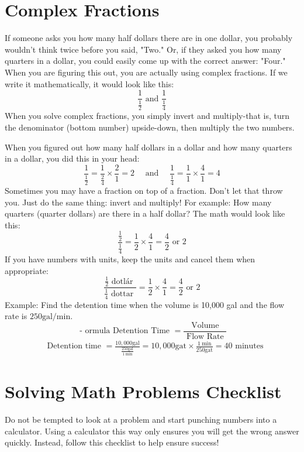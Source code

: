 \begin{enumerate}
\section{Complex Fractions}
If someone asks you how many half dollars there are in one dollar, you probably wouldn't think twice before you said, "Two." Or, if they asked you how many quarters in a dollar, you could easily come up with the correct answer: "Four." When you are figuring this out, you are actually using complex fractions. If we write it mathematically, it would look like this:
$$
\frac{1}{\frac{1}{2}} \text { and } \frac{1}{\frac{1}{4}}
$$
When you solve complex fractions, you simply invert and multiply-that is, turn the denominator (bottom number) upside-down, then multiply the two numbers.

When you figured out how many half dollars in a dollar and how many quarters in a dollar, you did this in your head:
$$
\frac{1}{\frac{1}{2}}=\frac{1}{\frac{2}{4}} \times \frac{2}{1}=2 \quad \text { and } \quad \frac{1}{\frac{1}{4}}=\frac{1}{1} \times \frac{4}{1}=4
$$
Sometimes you may have a fraction on top of a fraction. Don't let that throw you. Just do the same thing: invert and multiply! For example: How many quarters (quarter dollars) are there in a half dollar? The math would look like this:
$$
\frac{\frac{1}{2}}{\frac{1}{4}}=\frac{1}{2} \times \frac{4}{1}=\frac{4}{2} \text { or } 2
$$
If you have numbers with units, keep the units and cancel them when appropriate:
$$
\frac{\frac{1}{2} \text { dotlár }}{\frac{1}{4} \text { dottar }}=\frac{1}{2} \times \frac{4}{1}=\frac{4}{2} \text { or } 2
$$
Example: Find the detention time when the volume is 10,000 gal and the flow rate is $250 \mathrm{gal} / \mathrm{min}$.
$$
\text { - ormula Detention Time }=\frac{\text { Volume }}{\text { Flow Rate }}
$$
$$
\begin{aligned}
& \text { Detention time }=\frac{10,000 \mathrm{gal}}{\frac{250 \mathrm{gal}}{1 \mathrm{~min}}}=10,000 \mathrm{gat} \times \frac{1 \mathrm{~min}}{250 \mathrm{gat}}=40 \text { minutes } 
\end{aligned}
$$

\section{Solving Math Problems Checklist}
Do not be tempted to look at a problem and start punching numbers into a calculator. Using a calculator this way only ensures you will get the wrong answer quickly. Instead, follow this checklist to help ensure success!


\end{enumerate}
